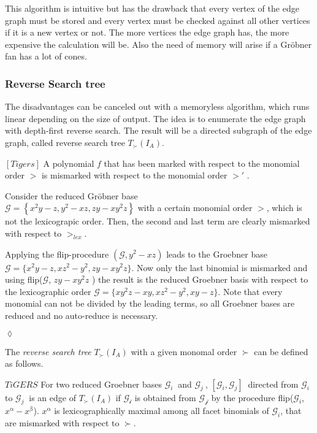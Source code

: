 This algorithm is intuitive but has the drawback that every vertex of the edge graph must be stored and every vertex must be checked against all other vertices if it is a new vertex or not. 
The more vertices the edge graph has, the more expensive the calculation will be. Also the need of memory will arise if a Gröbner fan has a lot of cones.
 
 \newpage

\subsubsection{Reverse Search tree}
The disadvantages can be canceled out with a memoryless algorithm, which runs linear depending on the size of output. The idea is to enumerate the edge graph with depth-first reverse search. The result will be a directed subgraph of the edge graph, called reverse search tree $T_{\succ}(I_{A}) $.\\

\begin{env_definition}
$\left[Tigers \right]  $
A polynomial $f$ that has been marked with respect to the monomial order $>$  is mismarked with respect to the monomial order $>'$  .
\end{env_definition}

\begin{env_example}\normalfont
Consider the reduced Gröbner base \\ $\mathcal{G} = \left\lbrace x^{2}y-z,y^{2}-xz, zy-xy^{2}z \right\rbrace $ 
with a certain monomial order $>$, which is not the lexicograpic order.
Then, the second and last term are clearly mismarked with respect to $>_{lex}$.

Applying the flip-procedure $(\mathcal{G},y^{2}-xz)$ leads to the Groebner base $\mathcal{G} = \{x^{2}y-z,xz^{2}-y^{2}, zy-xy^{2}z \} $. Now only the last binomial is mismarked and using flip($\mathcal{G}$, $zy-xy^{2}z$ ) the result is the reduced Groebner basis with respect to the lexicographic order $\mathcal{G} = \{xy^{2}z -xy, xz^{2}-y^{2},xy-z \} $. Note that every monomial can not be divided by the leading terms, so all Groebner bases are reduced and no auto-reduce is necessary.
 
\begin{flushright}
$\lozenge$
\end{flushright} 
\end{env_example}


The \textit{reverse search tree} $T_{\succ}(I_{A}) $ with a given monomal order $ \succ $ can be defined as follows.
\begin{env_definition}
\label{def:reverse}
$TiGERS  $ For two reduced Groebner bases $ \mathcal{G}_{i}~$ and $ \mathcal{G}_{j}~$, $[\mathcal{G}_{i},\mathcal{G}_{j} ]~$ directed from $\mathcal{G}_{i}~$ to $\mathcal{G}_{j}~$ is an edge of $T_{\succ}(I_{A}) $ if $\mathcal{G_{i}}$ is obtained from $\mathcal{G_{j}}$ by the procedure flip($\mathcal{G}_{i}$,$x^{\upalpha} - x^{\upbeta}$).
$x^{\upalpha}$ is lexicographically maximal among all facet binomials of $\mathcal{G}_{i}$, that are mismarked with respect to $\succ$.
\end{env_definition}


